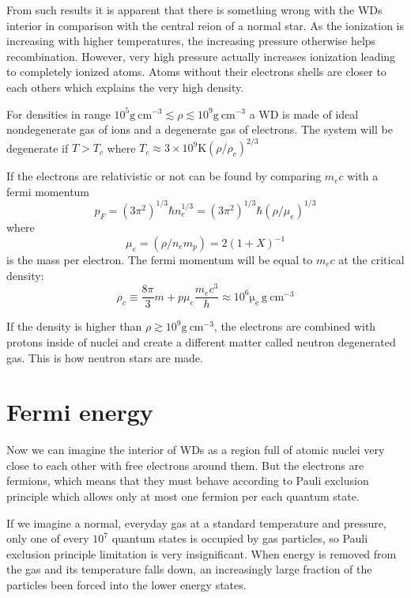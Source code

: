 \documentclass[oneside,a4paper,11pt]{report}
\begin{document}
From such results it is apparent that there is something wrong with the WDs interior in comparison with the central reion of a 
normal star. As the ionization is increasing with higher temperatures, the increasing pressure otherwise helps recombination. However, 
very high pressure actually increases ionization leading to completely ionized atoms. Atoms without their 
electrons shells are closer to each others which explains the very high density.

For densities in range $10^5 \mathrm{g\:cm^{-3}} \lesssim \rho \lesssim 10^9 \mathrm{g\:cm^{-3}}$ a WD is made 
of ideal nondegenerate gas of ions and a degenerate gas of electrons. The system will be degenerate 
if $T>T_c$ where $T_c \approx 3 \times 10^9 \mathrm{K} (\rho / \rho_c)^{2/3} $ 

If the electrons are relativistic or not can be found by comparing $m_e c$ with a fermi momentum
\begin{equation}
 p_F = (3\pi^2)^{1/3}\hbar n_e^{1/3} = (3\pi^2)^{1/3}\hbar (\rho/\mu_e)^{1/3}
\end{equation}
 where 
\begin{equation}
 \mu_e = (\rho / n_e m_p) = 2(1+X)^{-1}
\end{equation}
is the mass per electron. The fermi momentum will be equal to $m_e c$ at the critical density:
\begin{equation}
\rho_c \equiv \frac{8\pi}{3}m+p \mu_e \frac{m_ec^3}{h} \approx 10^6 \mathrm{\mu_e\:g\:cm^{-3}}
\end{equation}

If the density is higher than $\rho \gtrsim 10^9 \mathrm{g\:cm^{-3}} $, the electrons are combined with protons inside of nuclei and 
create a different matter called neutron degenerated gas. This is how neutron stars are made.    
 
\section{Fermi energy}
Now we can imagine the interior of WDs as a region full of atomic nuclei very close to each other 
with free electrons around them. But the electrons are fermions, which means that they must 
behave according to Pauli exclusion principle which allows only at most one fermion 
per each quantum state. 

If we imagine a normal, everyday gas at a standard temperature and pressure, only one 
of every $10^7$ quantum states is occupied by gas particles, so Pauli exclusion 
principle limitation is very insignificant. When energy is removed from the gas and 
its temperature falls down, an increasingly large fraction of  the particles been 
forced into the lower energy states.
\end{document}
